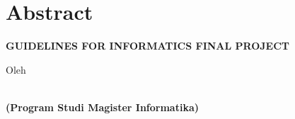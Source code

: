 \clearpage
\chapter*{Abstract}
\begin{center}
	\singlespacing
    \large \bfseries \MakeUppercase{Guidelines for Informatics Final Project} %

    \normalsize \normalfont Oleh

    \bfseries \large \theauthor\\
    \normalsize (Program Studi Magister Informatika)
    \bigskip
\end{center}

\begin{singlespace}

\blindtext

\end{singlespace}
\clearpage